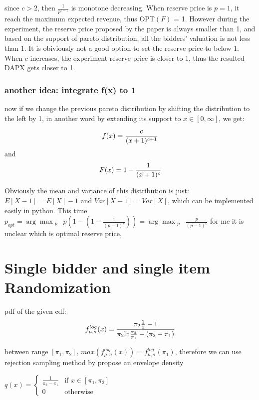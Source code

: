 since $c>2$, then $\frac{1}{p^{c-1}}$ is monotone decreasing. When reserve price is $p = 1$, it reach the maximum expected revenue, thus OPT$(F)$ = 1. However during the experiment, the reserve price proposed by the paper is always smaller than 1, and based on the support of pareto distribution, all the bidders' valuation is not less than 1. It is obiviously not a good option to set the reserve price to below 1. When $c$ increases, the experiment reserve price is closer to 1, thus the resulted DAPX gets closer to 1. 

\subsection{another idea: integrate f(x) to 1}
now if we change the previous pareto distribution by shifting the distribution to the left by 1, in another word by extending its support to $x \in [0,\infty]$,
we get:

\begin{equation}\notag
f(x) = \frac{c}{(x+1)^{c+1}} 
\end{equation} 
and 
\begin{equation}\notag
F(x) = 1- \frac{1}{(x+1)^c}
\end{equation} 

Obviously the mean and variance of this distribution is just:
$E[X-1] = E[X] - 1$ and $Var[X-1] = Var[X]$, which can be implemented easily in python. This time $p_{opt} =\displaystyle\arg \max_{\substack{p}} \  p(1 - (1-\frac{1}{(p-1)^c})) =\displaystyle\arg \max_{\substack{p}} \  \frac{p}{(p-1)^c}$ for me it is unclear which is optimal reserve price, 





\chapter{Single bidder and single item Randomization}

pdf of the given cdf: 
\begin{equation}\notag
	f^{log}_{\mu,\sigma} (x) =  \frac{\pi_2\frac{1}{x} -1}{\pi_2 \text{ln} \frac{\pi_2}{\pi_1} - (\pi_2-\pi_1)}
\end{equation} 

between range $[\pi_1,\pi_2]$, $ max (f^{log}_{\mu,\sigma} (x)) = f^{log}_{\mu,\sigma} (\pi_1)$, therefore we can use rejection sampling method by propose an envelope density 
\begin{center}
	$q(x) = \begin{cases} \frac{1}{\pi_2 - \pi_1}  & \text{if } x \in [\pi_1, \pi_2] \\ 0   & \text{otherwise } \end{cases}$
\end{center}

